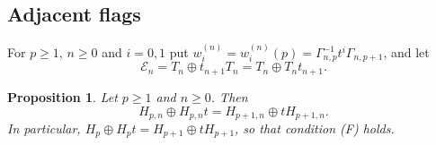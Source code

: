 \documentclass[11pt,a4paper]{amsart}
\newtheorem{proposition}[theorem]{Proposition}
\numberwithin{equation}{section}
\begin{document}
\subsection{Adjacent flags}

For $p\ge1$, $n\ge0$ and $i=0,1$ put $w_i^{(n)}=w_i^{(n)}(p)=\Gamma_{n,p}^{-1}t^i\Gamma_{n,p+1}$, and let
\[
\mathcal E_n=T_n\oplus t_{n+1}T_n=T_n\oplus T_nt_{n+1}.
\]

\begin{proposition}\label{prop:F}
Let $p\ge1$ and $n\ge0$. Then
\begin{equation}\label{eq:Fn}
H_{p,n}\oplus H_{p,n}t=H_{p+1,n}\oplus tH_{p+1,n}.
\end{equation}
In particular, $H_p\oplus H_pt=H_{p+1}\oplus tH_{p+1}$, so that condition \textup{(F)} holds.
\end{proposition}
\end{document}

